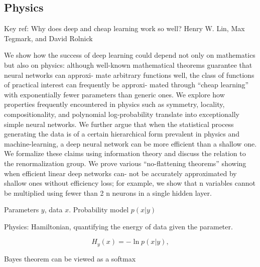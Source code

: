 \documentclass[english]{article}
\begin{document}


%
%
%
%
%
%
%
%
%
%
%
%


\subsection{Physics}


\benum
\item Key ref: Why does deep and cheap learning work so well? Henry W. Lin, Max Tegmark, and David Rolnick

\item We show how the success of deep learning could depend not only on mathematics but also on
physics: although well-known mathematical theorems guarantee that neural networks can approxi-
mate arbitrary functions well, the class of functions of practical interest can frequently be approxi-
mated through “cheap learning” with exponentially fewer parameters than generic ones. We explore
how properties frequently encountered in physics such as symmetry, locality, compositionality, and
polynomial log-probability translate into exceptionally simple neural networks. We further argue
that when the statistical process generating the data is of a certain hierarchical form prevalent
in physics and machine-learning, a deep neural network can be more efficient than a shallow one.
We formalize these claims using information theory and discuss the relation to the renormalization
group. We prove various “no-flattening theorems” showing when efficient linear deep networks can-
not be accurately approximated by shallow ones without efficiency loss; for example, we show that
n variables cannot be multiplied using fewer than 2 n neurons in a single hidden layer.

\item Parameters $y$, data $x$. Probability model $p(x|y)$

Physics: Hamiltonian, quantifying the energy of data given the parameter.

$$H_y(x) = -\ln p(x|y),$$

Bayes theorem can be viewed as a softmax
\end{document}
